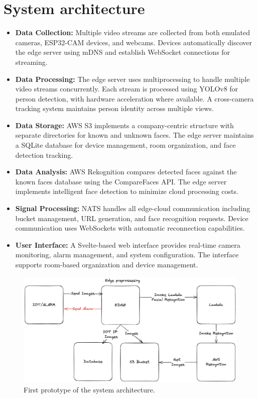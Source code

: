\documentclass[conference]{IEEEtran}
\begin{document}
\section{System architecture}
\begin{itemize}
      \item \textbf{Data Collection:} Multiple video streams are collected from both emulated cameras, ESP32-CAM devices, and webcams.
            Devices automatically discover the edge server using mDNS and establish WebSocket connections for streaming.          
      \item \textbf{Data Processing:} The edge server uses multiprocessing to handle multiple video streams concurrently.
            Each stream is processed using YOLOv8 for person detection, with hardware acceleration where available.
            A cross-camera tracking system maintains person identity across multiple views.          
      \item \textbf{Data Storage:} AWS S3 implements a company-centric structure with separate directories for known and unknown faces.
            The edge server maintains a SQLite database for device management, room organization, and face detection tracking.        
      \item \textbf{Data Analysis:} AWS Rekognition compares detected faces against the known faces database using the CompareFaces API.
            The edge server implements intelligent face detection to minimize cloud processing costs.       
      \item \textbf{Signal Processing:} NATS handles all edge-cloud communication including bucket management, URL generation,
            and face recognition requests. Device communication uses WebSockets with automatic reconnection capabilities.        
      \item \textbf{User Interface:} A Svelte-based web interface provides real-time camera monitoring, alarm management,
            and system configuration. The interface supports room-based organization and device management.
\end{itemize}

\begin{figure}[h!]
      \centering
      \includegraphics[width=1\linewidth]{images/architecture.excalidraw.png}
      \caption{First prototype of the system architecture.}
      \label{fig:prototype-1}
\end{figure}
\end{document}
